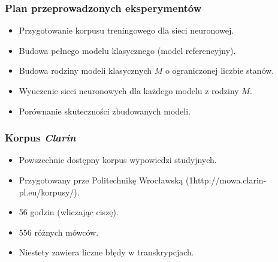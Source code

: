 \documentclass[mathserif, serif]{beamer}
\begin{document}
\begin{frame}
\begin{figure}
{
		}
	\end{figure}
		
	\end{frame}	

	\begin{frame}
		\frametitle{Plan przeprowadzonych eksperymentów}
		
		\begin{itemize}
			\item Przygotowanie korpusu treningowego dla sieci neuronowej.
			\item Budowa pełnego modelu klasycznego (model referencyjny).
			\item Budowa rodziny modeli klasycznych $M$ o ograniczonej liczbie stanów.
			\item Wyuczenie sieci neuronowych dla każdego modelu z rodziny $M$.
			\item Porównanie skuteczności zbudowanych modeli.
		\end{itemize}
	
	\end{frame}

	\begin{frame}
		\frametitle{Korpus \textit{Clarin}}
		
		\begin{itemize}
			\item Powszechnie dostępny korpus wypowiedzi studyjnych.
			\item Przygotowany prze Politechnikę Wrocławską (1http://mowa.clarin-pl.eu/korpusy/).
			\item 56 godzin (wliczając ciszę).
			\item 556 różnych mówców.
			\item Niestety zawiera liczne błędy w transkrypcjach.
		\end{itemize}
		
	\end{frame}
\end{document}
